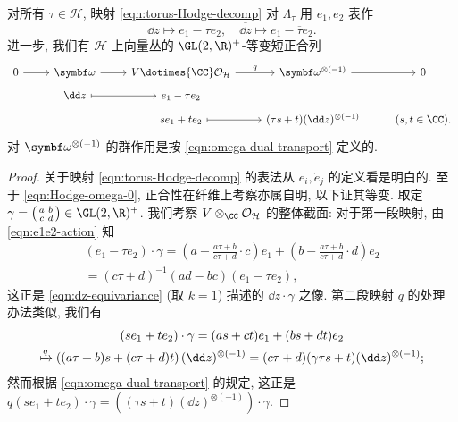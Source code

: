 \begin{lemma}\label{prop:e1e2}
	对所有 $\tau \in \mathcal{H}$, 映射 \eqref{eqn:torus-Hodge-decomp} 对 $\Lambda_\tau$ 用 $e_1, e_2$ 表作
	\[ \dd z \mapsto e_1 - \tau e_2, \quad \overline{\dd z} \mapsto e_1 - \overline{\tau} e_2. \]
	进一步, 我们有 $\mathcal{H}$ 上向量丛的 $\GL(2, \R)^+$-等变短正合列
	\begin{equation}\label{eqn:Hodge-omega-0}\begin{tikzcd}[row sep=tiny]
		0 \arrow[r] & \bomega \arrow[r] & V \dotimes{\CC} \mathcal{O}_{\mathcal{H}} \arrow[r, "q"] & \bomega^{\otimes (-1)} \arrow[r] & 0 \\
		& \dd z \arrow[mapsto, r] & e_1 - \tau e_2 & & \\
		& & s e_1 + t e_2 \arrow[mapsto, r] & (\tau s + t) (\dd z)^{\otimes (-1)} & (s, t \in \CC).
	\end{tikzcd}\end{equation}
	对 $\bomega^{\otimes (-1)}$ 的群作用是按 \eqref{eqn:omega-dual-transport} 定义的.
\end{lemma}
\begin{proof}
	关于映射 \eqref{eqn:torus-Hodge-decomp} 的表法从 $e_i, \check{e}_j$ 的定义看是明白的. 至于 \eqref{eqn:Hodge-omega-0}, 正合性在纤维上考察亦属自明, 以下证其等变. 取定 $\gamma = \twomatrix{a}{b}{c}{d} \in \GL(2, \R)^+$. 我们考察 $V \otimes_{\CC} \mathcal{O}_{\mathcal{H}}$ 的整体截面: 对于第一段映射, 由 \eqref{eqn:e1e2-action} 知
	\begin{multline*}
		(e_1 - \tau e_2) \cdot \gamma = \left( a - \frac{a\tau + b}{c\tau + d} \cdot c \right) e_1 + \left(b - \frac{a\tau + b}{c\tau + d} \cdot d \right)e_2 \\
		= (c\tau + d)^{-1} (ad - bc) (e_1 - \tau e_2),
	\end{multline*}
	这正是 \eqref{eqn:dz-equivariance} (取 $k=1$) 描述的 $\dd z \cdot \gamma$ 之像. 第二段映射 $q$ 的处理办法类似, 我们有
	\begin{multline*}
		(s e_1 + t e_2) \cdot \gamma = (as + ct) e_1 + (bs + dt) e_2 \\
		\xmapsto{q} \left( (a\tau + b) s + (c\tau + d)t \right) (\dd z)^{\otimes (-1)} = (c\tau + d) (\gamma\tau s + t) (\dd z)^{\otimes (-1)} ;
	\end{multline*}
	然而根据 \eqref{eqn:omega-dual-transport} 的规定, 这正是 $q(s e_1 + t e_2) \cdot \gamma = \left((\tau s + t) (\dd z)^{\otimes (-1)} \right) \cdot \gamma$.
\end{proof}

